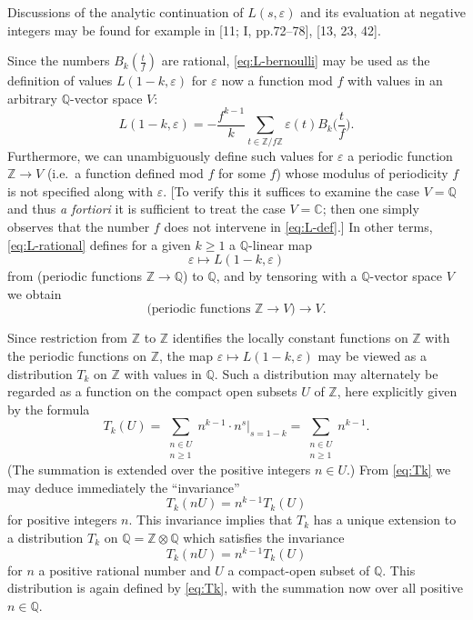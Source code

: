 \documentclass[12pt,a4paper]{article}
\theoremstyle{plain}
\theoremstyle{definition}
\newcommand{\Z}{\mathbb{Z}}
\newcommand{\Q}{\mathbb{Q}}
\newcommand{\C}{\mathbb{C}}
\begin{document}
Discussions of the analytic continuation of $L(s,\varepsilon)$ and its evaluation at negative integers may be found for example in [11; I, pp.72--78], [13, 23, 42].

Since the numbers $B_k(\frac{t}{f})$ are rational, \eqref{eq:L-bernoulli} may be used as the definition of values $L(1-k,\varepsilon)$ for $\varepsilon$ now a function mod $f$ with values in an arbitrary $\Q$-vector space $V$:
\begin{equation}\label{eq:L-rational}
L(1-k,\varepsilon)=-\frac{f^{k-1}}{k}\sum_{t\in\Z/f\Z}\varepsilon(t)B_k\Big(\frac{t}{f}\Big).
\end{equation}
Furthermore, we can unambiguously define such values for $\varepsilon$ a periodic function $\Z\to V$ (i.e.~a function defined mod $f$ for some $f$) whose modulus of periodicity $f$ is not specified along with $\varepsilon$. [To verify this it suffices to examine the case $V=\Q$ and thus \textit{a fortiori} it is sufficient to treat the case $V=\C$; then one simply observes that the number $f$ does not intervene in \eqref{eq:L-def}.] In other terms, \eqref{eq:L-rational} defines for a given $k\ge1$ a $\Q$-linear map
\[
\varepsilon\mapsto L(1-k,\varepsilon)
\]
from (periodic functions $\Z\to\Q$) to $\Q$, and by tensoring with a $\Q$-vector space $V$ we obtain
\[
\text{(periodic functions $\Z\to V$)}\to V.
\]

Since restriction from $\Z$ to $\Z$ identifies the locally constant functions on $\Z$ with the periodic functions on $\Z$, the map $\varepsilon\mapsto L(1-k,\varepsilon)$ may be viewed as a distribution $T_k$ on $\Z$ with values in $\Q$. Such a distribution may alternately be regarded as a function on the compact open subsets $U$ of $\Z$, here explicitly given by the formula
\begin{equation}\label{eq:Tk}
T_k(U)=\sum_{\substack{n\in U\\n\ge1}}n^{k-1}\cdot n^{s}\Big|_{s=1-k}=\sum_{\substack{n\in U\\n\ge1}}n^{k-1}.
\end{equation}
(The summation is extended over the positive integers $n\in U$.) From \eqref{eq:Tk} we may deduce immediately the ``invariance''
\begin{equation}\label{eq:invariance-Z}
T_k(nU)=n^{k-1}T_k(U)
\end{equation}
for positive integers $n$. This invariance implies that $T_k$ has a unique extension to a distribution $T_k$ on $\Q=\Z\otimes\Q$ which satisfies the invariance
\begin{equation}\label{eq:invariance-Q}
T_k(nU)=n^{k-1}T_k(U)
\end{equation}
for $n$ a positive rational number and $U$ a compact-open subset of $\Q$. This distribution is again defined by \eqref{eq:Tk}, with the summation now over all positive $n\in\Q$.
\end{document}
